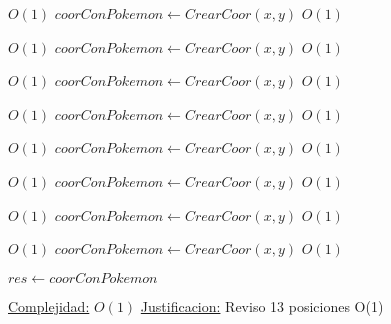 \begin{Algoritmos}
\begin{algorithmic}[1]
\EndIf


         \Comment $O(1)$
        \State $coorConPokemon \gets CrearCoor(x, y)$    \Comment $O(1)$
    \EndIf


             \Comment $O(1)$
            \State $coorConPokemon \gets CrearCoor(x, y)$    \Comment $O(1)$
        \EndIf

    \EndIf

\EndIf


         \Comment $O(1)$
        \State $coorConPokemon \gets CrearCoor(x, y)$    \Comment $O(1)$
    \EndIf


             \Comment $O(1)$
            \State $coorConPokemon \gets CrearCoor(x, y)$    \Comment $O(1)$
        \EndIf


    \EndIf

\EndIf

         \Comment $O(1)$
        \State $coorConPokemon \gets CrearCoor(x, y)$    \Comment $O(1)$
        \EndIf

             \Comment $O(1)$
            \State $coorConPokemon \gets CrearCoor(x, y)$    \Comment $O(1)$
        \EndIf
    \EndIf

             \Comment $O(1)$
            \State $coorConPokemon \gets CrearCoor(x, y)$    \Comment $O(1)$
        \EndIf

    \EndIf
\EndIf

         \Comment $O(1)$
        \State $coorConPokemon \gets CrearCoor(x, y)$    \Comment $O(1)$
    \EndIf
\EndIf

\State $res \gets coorConPokemon$

\medskip
\State \underline{Complejidad:} $O(1)$ %
\State \underline{Justificacion:} Reviso 13 posiciones O(1)

\end{algorithmic}




\end{Algoritmos}
